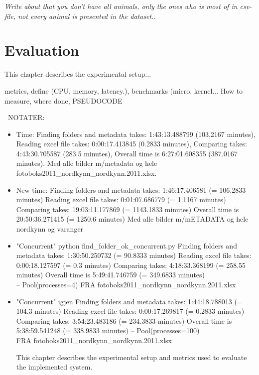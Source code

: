 \documentclass[USenglish]{uit-thesis}
\begin{document}
\textit{Write about that you don't have all animals, only the ones who is most of in csv-file, not every animal is presented in the dataset..}



\chapter{Evaluation} 
This chapter describes the experimental setup...

metrics, define (CPU, memory, latency.), benchmarks (micro, kernel...
How to measure, where done, PSEUDOCODE

\ NOTATER:

\begin{itemize}

\item Time: Finding folders and metadata takes:  1:43:13.488799 (103,2167 minutes),
Reading excel file takes:  0:00:17.413845 (0.2833 minutes),
Comparing takes:  4:43:30.705587 (283.5 minutes),
Overall time is  6:27:01.608355 (387.0167 minutes).
Med alle bilder m/metadata og hele fotoboks2011\_nordkynn\_nordkynn.2011.xlsx.

\item New time: Finding folders and metadata takes:  1:46:17.406581 (= 106.2833 minutes)
Reading excel file takes:  0:01:07.686779 (= 1.1167 minutes)
Comparing takes:  19:03:11.177869 (= 1143.1833 minutes)
Overall time is  20:50:36.271415 (= 1250.6 minutes)
Med alle bilder m/mETADATA og hele nordkynn og varanger

\item "Concurrent" python find\_folder\_ok\_concurrent.py 
Finding folders and metadata takes:  1:30:50.250732 (= 90.8333 minutes)
Reading excel file takes:  0:00:18.127597 (= 0.3 minutes)
Comparing takes:  4:18:33.368199 (= 258.55 minutes)
Overall time is  5:49:41.746759 (= 349.6833 minutes)
\\ -- Pool(processes=4)
FRA fotoboks2011\_nordkynn\_nordkynn.2011.xlsx

\item "Concurrent" igjen
Finding folders and metadata takes:  1:44:18.788013 (= 104.3 minutes)
Reading excel file takes:  0:00:17.269817 (= 0.2833 minutes)
Comparing takes:  3:54:23.483186 (= 234.3833 minutes)
Overall time is  5:38:59.541248 (= 338.9833 minutes)
-- Pool(processes=100)
\\ FRA fotoboks2011\_nordkynn\_nordkynn.2011.xlsx

This chapter describes the experimental setup and metrics used to evaluate the implemented system. 

\end{itemize}
\end{document}
